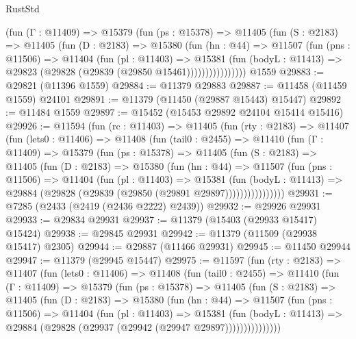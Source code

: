 \begin{lexlean}{RustStd}
\begin{coremodule}
              (fun (Γ : @11409) =>
              @15379
                (fun (ps : @15378) =>
                @11405
                  (fun (S : @2183) =>
                  @11405
                    (fun (D : @2183) =>
                    @15380
                      (fun (hn : @44) =>
                      @11507
                        (fun (pns : @11506) =>
                        @11404
                          (fun (pl : @11403) =>
                          @15381
                            (fun (bodyL : @11413) =>
                            @29823 (@29828 (@29839 (@29850 @15461))))))))))))))))
    @1559
@29883 := @29821 (@11396 @1559)
@29884 := @11379 @29883
@29887 := @11458 (@11459 @1559) @24101
@29891 := @11379 (@11450 (@29887 @15443) @15447)
@29892 := @11484 @1559
@29897 := @15452 (@15453 @29892 @24104 @15414 @15416)
@29926 := @11594
    (fun (rc : @11403) =>
    @11405
      (fun (rty : @2183) =>
      @11407
        (fun (lets0 : @11406) =>
        @11408
          (fun (tail0 : @2455) =>
          @11410
            (fun (Γ : @11409) =>
            @15379
              (fun (ps : @15378) =>
              @11405
                (fun (S : @2183) =>
                @11405
                  (fun (D : @2183) =>
                  @15380
                    (fun (hn : @44) =>
                    @11507
                      (fun (pns : @11506) =>
                      @11404
                        (fun (pl : @11403) =>
                        @15381
                          (fun (bodyL : @11413) =>
                          @29884 (@29828 (@29839 (@29850 (@29891 @29897))))))))))))))))
@29931 := @7285 (@2433 (@2419 (@2436 @2222) @2439))
@29932 := @29926 @29931
@29933 := @29834 @29931
@29937 := @11379 (@15403 (@29933 @15417) @15424)
@29938 := @29845 @29931
@29942 := @11379 (@11509 (@29938 @15417) @2305)
@29944 := @29887 (@11466 @29931)
@29945 := @11450 @29944
@29947 := @11379 (@29945 @15447)
@29975 := @11597
    (fun (rty : @2183) =>
    @11407
      (fun (lets0 : @11406) =>
      @11408
        (fun (tail0 : @2455) =>
        @11410
          (fun (Γ : @11409) =>
          @15379
            (fun (ps : @15378) =>
            @11405
              (fun (S : @2183) =>
              @11405
                (fun (D : @2183) =>
                @15380
                  (fun (hn : @44) =>
                  @11507
                    (fun (pns : @11506) =>
                    @11404
                      (fun (pl : @11403) =>
                      @15381
                        (fun (bodyL : @11413) =>
                        @29884 (@29828 (@29937 (@29942 (@29947 @29897)))))))))))))))

\end{coremodule}
\end{lexlean}
